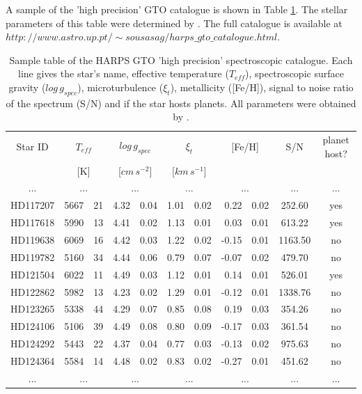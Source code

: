 \documentclass[dvips,12pt,a4paper]{report}
\begin{document}
{A sample of the 'high precision' GTO catalogue is shown in Table \ref{cat_sample}. The stellar parameters of this table were determined by \citet{Sousa-2008}. The full catalogue is available at $http://www.astro.up.pt/\sim sousasag/harps\_gto\_catalogue.html$. 

\begin{table}[h]
  \centering
\caption[Sample table of the HARPS GTO ``high precision'' spectroscopic catalogue.]{Sample table of the HARPS GTO 'high precision' spectroscopic catalogue. Each line gives the star's name, effective temperature ($T_{eff}$), spectroscopic surface gravity ($log\,g_{spec}$), microturbulence ($\xi_t$), metallicity ([Fe/H]), signal to noise ratio of the spectrum (S/N) and if the star hosts planets. All parameters were obtained by \citet{Sousa-2008}.}
  \label{cat_sample}
  \begin{tabular}{ c r@{$\pm$}l r@{$\pm$}l r@{$\pm$}l r@{$\pm$}l c c}
  \hline
  \hline
Star ID & \multicolumn {2}{c}{$T_{eff}$} & \multicolumn {2}{c}{$log\,g_{spec}$} & \multicolumn {2}{c}{$\xi_t$} & \multicolumn {2}{c}{[Fe/H]} & S/N & planet host? \\ 
& \multicolumn {2}{c}{[K]} & \multicolumn {2}{c}{[$cm\,s^{-2}$]} & \multicolumn {2}{c}{[$km\,s^{-1}$]} & \multicolumn {2}{c}{ } &  &  \\
\hline
... & \multicolumn {2}{c}{...} & \multicolumn {2}{c}{...} & \multicolumn {2}{c}{...} & \multicolumn {2}{c}{...} & ... & ... \\
HD117207 & 5667 & 21 & 4.32 & 0.04 & 1.01 & 0.02 & 0.22 & 0.02 & 252.60 & yes \\
HD117618 & 5990 & 13 & 4.41 & 0.02 & 1.13 & 0.01 & 0.03 & 0.01 & 613.22 & yes \\
HD119638 & 6069 & 16 & 4.42 & 0.03 & 1.22 & 0.02 & -0.15 & 0.01 & 1163.50 & no \\
HD119782 & 5160 & 34 & 4.44 & 0.06 & 0.79 & 0.07 & -0.07 & 0.02 & 479.70 & no \\
HD121504 & 6022 & 11 & 4.49 & 0.03 & 1.12 & 0.01 & 0.14 & 0.01 & 526.01 & yes \\
HD122862 & 5982 & 13 & 4.23 & 0.02 & 1.29 & 0.01 & -0.12 & 0.01 & 1338.76 & no \\
HD123265 & 5338 & 44 & 4.29 & 0.07 & 0.85 & 0.08 & 0.19 & 0.03 & 354.26 & no \\
HD124106 & 5106 & 39 & 4.49 & 0.08 & 0.80 & 0.09 & -0.17 & 0.03 & 361.54 & no \\
HD124292 & 5443 & 22 & 4.37 & 0.04 & 0.77 & 0.03 & -0.13 & 0.02 & 975.63 & no \\
HD124364 & 5584 & 14 & 4.48 & 0.02 & 0.83 & 0.02 & -0.27 & 0.01 & 451.62 & no \\
... & \multicolumn {2}{c}{...} & \multicolumn {2}{c}{...} & \multicolumn {2}{c}{...} & \multicolumn {2}{c}{...} & ... & ... \\
\hline
\end{tabular}
\end{table}





}
\end{document}

